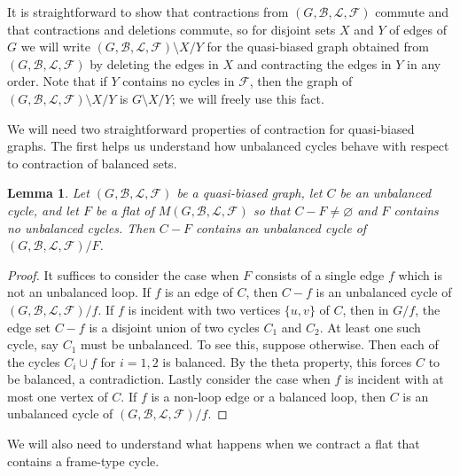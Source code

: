 \documentclass[12pt]{article}
\newtheorem{lemma}[theorem]{Lemma}
\theoremstyle{definition}
\theoremstyle{plain} %
\newcommand{\cB}{\mathcal{B}}
\newcommand{\cF}{\mathcal{F}}
\newcommand{\cL}{\mathcal{L}}
\newcommand{\del}{\!\setminus\!}
\begin{document}
It is straightforward to show that contractions from $(G, \cB, \cL, \cF)$ commute and that contractions and deletions commute, so for disjoint sets $X$ and $Y$ of edges of $G$ we will write $(G, \cB, \cL, \cF)\del X/Y$ for the quasi-biased graph obtained from $(G, \cB, \cL, \cF)$ by deleting the edges in $X$ and contracting the edges in $Y$ in any order.
Note that if $Y$ contains no cycles in $\cF$, then the graph of $(G, \cB, \cL, \cF) \del X/Y$ is $G \del X/Y$; we will freely use this fact.

We will need two straightforward properties of contraction for quasi-biased graphs.
The first helps us understand how unbalanced cycles behave with respect to contraction of balanced sets.


\begin{lemma} \label{lem: unbalanced cycles preserved by contraction}
Let $(G, \cB, \cL, \cF)$ be a quasi-biased graph, let $C$ be an unbalanced cycle, and let $F$ be a flat of $M(G, \cB, \cL, \cF)$ so that $C - F \ne \varnothing$ and $F$ contains no unbalanced cycles.
Then $C - F$ contains an unbalanced cycle of $(G, \cB, \cL, \cF)/F$. 

\end{lemma}
\begin{proof}
It suffices to consider the case when $F$ consists of a single edge $f$ which is not an unbalanced loop. If $f$ is an edge of $C$, then $C-f$ is an unbalanced cycle of $(G,\cB,\cL,\cF)/f$. If $f$ is incident with two vertices $\{u,v\}$ of $C$, then in $G/f$, the edge set $C-f$ is a disjoint union of two cycles $C_1$ and $C_2$. At least one such cycle, say $C_1$ must be unbalanced. To see this, suppose otherwise. Then each of the cycles $C_i\cup f$ for $i=1,2$ is balanced. By the theta property, this forces $C$ to be balanced, a contradiction. Lastly consider the case when $f$ is incident with at most one vertex of $C$. If $f$ is a non-loop edge or a balanced loop, then $C$ is an unbalanced cycle of $(G,\cB,\cL,\cF)/f$. 

\end{proof}



We will also need to understand what happens when we contract a flat that contains a frame-type cycle.
\end{document}
